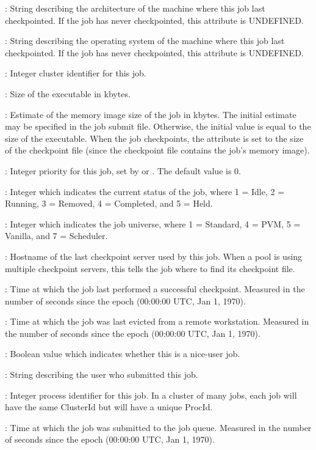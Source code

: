 \begin{description}
%
%
\item[\AdAttr{CkptArch}] : String describing the architecture of the machine
where this job last checkpointed.  If the job has never checkpointed,
this attribute is UNDEFINED.
%
\item[\AdAttr{CkptOpSys}] : String describing the operating system of
the machine where this job last checkpointed.  If the job has never
checkpointed, this attribute is UNDEFINED.
%
\item[\AdAttr{ClusterId}] : Integer cluster identifier for this job.
%
\item[\AdAttr{ExecutableSize}] : Size of the executable in kbytes.
%
\item[\AdAttr{ImageSize}] : Estimate of the memory image size of the
job in kbytes.  The initial estimate may be specified in the job
submit file.  Otherwise, the initial value is equal to the size of the
executable.  When the job checkpoints, the 
attribute is set to the size of the checkpoint file (since the
checkpoint file contains the job's memory image).
%
\item[\AdAttr{JobPrio}] : Integer priority for this job, set by
 or .  The default value is 0.
%
\item[\AdAttr{JobStatus}] : Integer which indicates the current
status of the job, where 1 = Idle, 2 = Running, 3 = Removed, 4 =
Completed, and 5 = Held.
%
\item[\AdAttr{JobUniverse}] : Integer which indicates the job
universe, where 1 = Standard, 4 = PVM, 5 = Vanilla, and 7 = Scheduler.
%
\item[\AdAttr{LastCkptServer}] : Hostname of the last checkpoint
server used by this job.  When a pool is using multiple checkpoint
servers, this tells the job where to find its checkpoint file.
%
\item[\AdAttr{LastCkptTime}] : Time at which the job last performed a
successful checkpoint.  Measured in the number of seconds since the
epoch (00:00:00 UTC, Jan 1, 1970).
%
\item[\AdAttr{LastVacateTime}] : Time at which the job was last
evicted from a remote workstation.  Measured in the number of seconds
since the epoch (00:00:00 UTC, Jan 1, 1970).
%
\item[\AdAttr{NiceUser}] : Boolean value which indicates whether
this is a nice-user job.
%
\item[\AdAttr{Owner}] : String describing the user who submitted this
job.
%
\item[\AdAttr{ProcId}] : Integer process identifier for this job.  In
a cluster of many jobs, each job will have the same ClusterId but will
have a unique ProcId.
%
\item[\AdAttr{QDate}] : Time at which the job was submitted to the job
queue.  Measured in the
number of seconds since the epoch (00:00:00 UTC, Jan 1, 1970).
%
\end{description}
